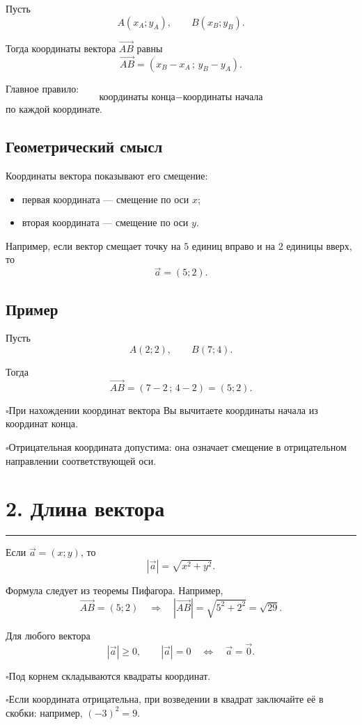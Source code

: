 \documentclass[a4paper,12pt]{article}
\newcommand{\vect}[1]{\overrightarrow{#1}}
\newcommand{\vct}[1]{\vec{#1}}
\newcommand{\modv}[1]{\left|#1\right|}
\newcommand{\sectionline}{%
    \vspace{0.1em}
    {\color{accent}\rule{\linewidth}{0.6pt}}
    \vspace{0.3em}
}
\newcommand{\topic}[1]{%
    \Needspace{7\baselineskip}%
    \section*{\color{darkaccent}#1}
    \sectionline
}
\newcommand{\checkitem}[1]{%
    \par\noindent
    {\color{accent}\(\square\)}\;#1\par
}
\begin{document}
Пусть
\[
A(x_A;y_A),
\qquad
B(x_B;y_B).
\]

Тогда координаты вектора \(\vect{AB}\) равны
\[
\boxed{
\vect{AB}
=
(x_B-x_A\,;\,y_B-y_A)
}.
\]

Главное правило:
\[
\boxed{\text{координаты конца} - \text{координаты начала}}
\]
по каждой координате.

\subsection*{\color{darkaccent}Геометрический смысл}

Координаты вектора показывают его смещение:

\begin{itemize}
    \item первая координата --- смещение по оси \(x\);
    \item вторая координата --- смещение по оси \(y\).
\end{itemize}

Например, если вектор смещает точку на \(5\) единиц вправо и на \(2\) единицы вверх, то
\[
\vct a=(5;2).
\]

\subsection*{\color{darkaccent}Пример}

Пусть
\[
A(2;2),
\qquad
B(7;4).
\]

Тогда
\[
\vect{AB}
=
(7-2\,;\,4-2)
=
(5;2).
\]

\checkitem{При нахождении координат вектора Вы вычитаете координаты начала из координат конца.}

\checkitem{Отрицательная координата допустима: она означает смещение в отрицательном направлении соответствующей оси.}

\topic{2. Длина вектора}

Если \(\vct a=(x;y)\), то
\[
\boxed{
\modv{\vct a}=\sqrt{x^2+y^2}
}.
\]

Формула следует из теоремы Пифагора. Например,
\[
\vect{AB}=(5;2)
\quad\Longrightarrow\quad
\modv{\vect{AB}}=\sqrt{5^2+2^2}=\sqrt{29}.
\]

Для любого вектора
\[
\modv{\vct a}\ge 0,
\qquad
\modv{\vct a}=0\quad\Longleftrightarrow\quad\vct a=\vct 0.
\]

\checkitem{Под корнем складываются квадраты координат.}

\checkitem{Если координата отрицательна, при возведении в квадрат заключайте её в скобки: например, \((-3)^2=9\).}
\end{document}
